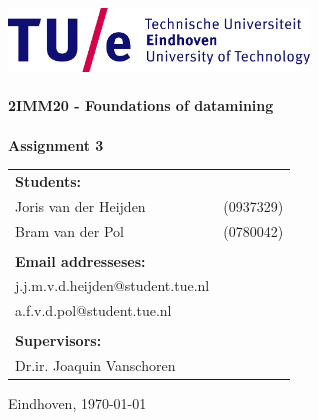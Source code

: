 \begin{titlepage}

\begin{center}

\includegraphics[width=0.6\textwidth]{./Figures/TUe}~\\[2cm]



\HRule \\[0.4cm]
{ \huge \bfseries 2IMM20 - Foundations of datamining\\[0.3cm] }
\HRule \\[1.5cm]
\textbf{Assignment 3}



\vfill

\begin{table}[h]
\begin{tabular}{ll}
\textbf{Students:} & \\
Joris van der Heijden & (0937329)\\
Bram van der Pol & (0780042)\\

\\
\textbf{Email addresseses:} & \\
j.j.m.v.d.heijden@student.tue.nl \\
a.f.v.d.pol@student.tue.nl \\
\\
\textbf{Supervisors:} &\\
Dr.ir. Joaquin Vanschoren
\\

\end{tabular}
\end{table}



\large
{ Eindhoven, \today}

\end{center}


\end{titlepage}
